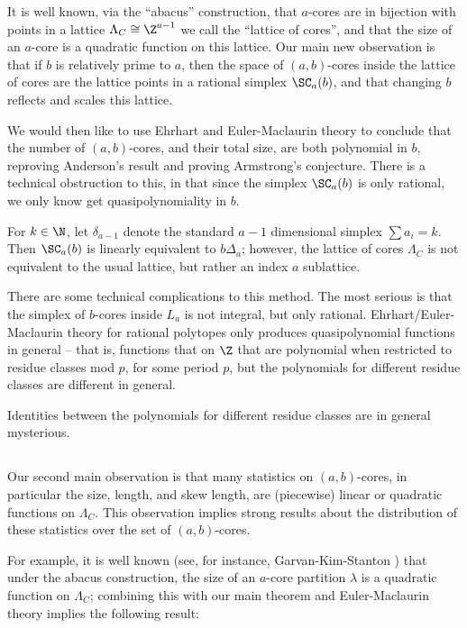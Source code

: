 It is well known, via the ``abacus'' construction, that $a$-cores are
in bijection with points in a lattice $\Lambda_C\cong\Z^{a-1}$ we call the
``lattice of cores'', and that the size of an $a$-core is a quadratic function on this lattice.  Our main new observation is that if $b$ is relatively
prime to $a$, then the space of $(a,b)$-cores inside the
lattice of cores are the lattice points in a rational simplex $\SC_a(b)$, and that changing $b$ reflects and scales this lattice.  

We would then like to use Ehrhart and Euler-Maclaurin theory to conclude that the number of $(a,b)$-cores, and their total size, are both polynomial in $b$, reproving Anderson's result and proving Armstrong's conjecture.  There is a technical obstruction to this, in that since the simplex $\SC_a(b)$ is only rational, we only know get quasipolynomiality in $b$.


For $k\in\N$, let $\delta_{a-1}$ denote the
standard $a-1$ dimensional simplex $\sum a_i=k$.  Then $\SC_a(b)$ is
linearly equivalent to $b\Delta_a$; however, the lattice of cores
$\Lambda_C$ is not equivalent to the usual lattice, but rather an
index $a$ sublattice.




There are some technical complications to this method.  The most serious is that the simplex of $b$-cores inside $L_a$ is not integral,
but only rational.  Ehrhart/Euler-Maclaurin theory for
rational polytopes only produces quasipolynomial functions in general -- that
is, functions that on $\Z$ that are polynomial when restricted to
residue classes mod $p$, for some period $p$, but the polynomials for different residue classes are different in general.

Identities between the polynomials for
different residue classes are in general mysterious.  


\subsection{}
Our second main observation is that many statistics on $(a,b)$-cores, in particular the size, length, and skew length, are (piecewise) linear or quadratic functions on $\Lambda_C$.  This observation implies strong results about the distribution of these statistics over the set of $(a,b)$-cores.

For example, it is well known (see, for instance, Garvan-Kim-Stanton \cite{GKS}) that under the abacus construction, the size of an $a$-core partition $\lambda$ is a quadratic function on $\Lambda_C$; combining this with our main theorem and Euler-Maclaurin theory implies the following result: 




